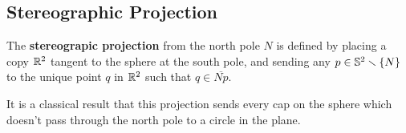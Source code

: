 \subsection{Stereographic Projection}


\begin{definition}
  The \textbf{stereograpic projection} from the north pole $N$ is
  defined by placing a copy $\mathbb{R}^2$ tangent to the sphere at the south
  pole, and sending any $p\in \mathbb{S}^2\smallsetminus \{N\}$ to 
  the unique point $q$ in $\mathbb{R}^2$ such that $q\in \overline{Np}$.
\end{definition}
\begin{remark}
  It is a classical result that this projection sends every cap on
  the sphere which doesn't pass through the north pole to a circle in
  the plane. 
\end{remark}

